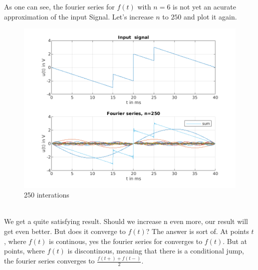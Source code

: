 \documentclass[a4paper]{article}
\begin{document}
\clearpage
As one can see, the fourier series for $f(t)$ with $n=6$ is not yet an acurate approximation of
the input Signal. Let's increase $n$ to  $250$ and plot it again. 
\begin{figure}[h!] \centering
  \includegraphics{"./Figures/fourier_n250.png"}
  \caption{250 interations}
  \label{fig:fourier250}
\end{figure}
\\ We get a quite satisfying result. Should we increase n even more, our result will get even better.
But does it converge to $f(t)$? The answer is sort of. At points $t$, where  $f(t)$ is continous,
yes the fourier series for converges to $f(t)$. But at points, where $f(t)$ is discontinous, meaning
that there is a conditional jump, the fourier series converges to  $\frac{f(t+) + f(t-)}{2}$.
\end{document}
